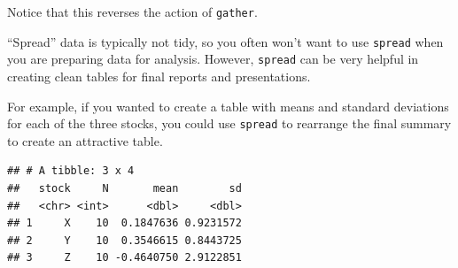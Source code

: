 \documentclass[]{book}
\makeatletter
\newenvironment{Shaded}{\begin{snugshade}}{\end{snugshade}}
\newcommand{\KeywordTok}[1]{\textcolor[rgb]{0.13,0.29,0.53}{\textbf{#1}}}
\newcommand{\DataTypeTok}[1]{\textcolor[rgb]{0.13,0.29,0.53}{#1}}
\newcommand{\DecValTok}[1]{\textcolor[rgb]{0.00,0.00,0.81}{#1}}
\newcommand{\StringTok}[1]{\textcolor[rgb]{0.31,0.60,0.02}{#1}}
\newcommand{\OperatorTok}[1]{\textcolor[rgb]{0.81,0.36,0.00}{\textbf{#1}}}
\newcommand{\NormalTok}[1]{#1}
\newenvironment{kframe}{%
\medskip{}
\setlength{\fboxsep}{.8em}
 \def\at@end@of@kframe{}%
 \ifinner\ifhmode%
  \def\at@end@of@kframe{\end{minipage}}%
  \begin{minipage}{\columnwidth}%
 \fi\fi%
 \def\FrameCommand##1{\hskip\@totalleftmargin \hskip-\fboxsep
 \colorbox{shadecolor}{##1}\hskip-\fboxsep
     \hskip-\linewidth \hskip-\@totalleftmargin \hskip\columnwidth}%
 \MakeFramed {\advance\hsize-\width
   \@totalleftmargin\z@ \linewidth\hsize
   \@setminipage}}%
 {\par\unskip\endMakeFramed%
 \at@end@of@kframe}
\renewenvironment{Shaded}{\begin{kframe}}{\end{kframe}}
\theoremstyle{definition}
\theoremstyle{definition}
\theoremstyle{definition}
\theoremstyle{remark}
\makeatother
\begin{document}
Notice that this reverses the action of \texttt{gather}.

``Spread'' data is typically not tidy, so you often won't want to use
\texttt{spread} when you are preparing data for analysis. However,
\texttt{spread} can be very helpful in creating clean tables for final
reports and presentations.

For example, if you wanted to create a table with means and standard
deviations for each of the three stocks, you could use \texttt{spread}
to rearrange the final summary to create an attractive table.

\begin{Shaded}
\end{Shaded}

\begin{verbatim}
## # A tibble: 3 x 4
##   stock     N       mean        sd
##   <chr> <int>      <dbl>     <dbl>
## 1     X    10  0.1847636 0.9231572
## 2     Y    10  0.3546615 0.8443725
## 3     Z    10 -0.4640750 2.9122851
\end{verbatim}

\begin{Shaded}
\end{Shaded}
\end{document}
